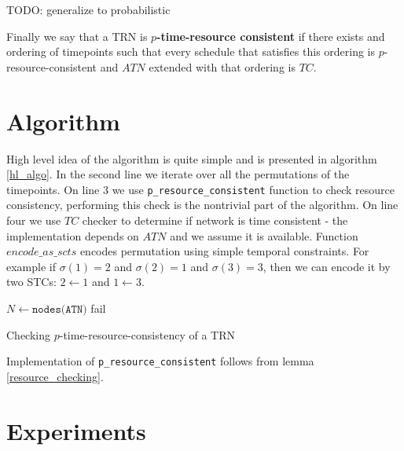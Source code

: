 \documentclass{article}
\begin{document}
\begin{multicols}{2}
TODO: generalize to probabilistic

Finally we say that a TRN is \textbf{$p$-time-resource consistent} if there exists and ordering of timepoints such that every schedule that satisfies this ordering is $p$-resource-consistent and $ATN$ extended with that ordering is $TC$.

\section{Algorithm}
High level idea of the algorithm is quite simple and is presented in algorithm \ref{hl_algo}. In the second line we iterate over all the permutations of the timepoints. On line 3 we use \texttt{p\_resource\_consistent} function to check resource consistency, performing this check is the nontrivial part of the algorithm. On line four we use $TC$ checker to determine if network is time consistent - the implementation depends on $ATN$ and we assume it is available. Function $encode\_as\_scts$ encodes permutation using simple temporal constraints. For example if $\sigma(1) = 2$ and $\sigma(2) = 1$ and $\sigma(3) = 3$, then we can encode it by two STCs: $ 2 \leftarrow 1 $ and $1 \leftarrow 3$.

\begin{algorithm}[H]
    \label{hl_algo}
    $N \leftarrow \texttt{nodes(ATN)}$\;
    fail\;
    \caption{Checking $p$-time-resource-consistency of a TRN }
\end{algorithm}
Implementation of \texttt{p\_resource\_consistent} follows from lemma \ref{resource_checking}.






\section{Experiments}


\end{multicols}
\end{document}
